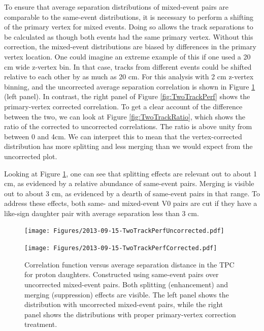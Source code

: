 To ensure that average separation distributions of mixed-event pairs are comparable to the same-event distributions, it is necessary to perform a shifting of the primary vertex for mixed events.  Doing so allows the track separations to be calculated as though both events had the same primary vertex.  Without this correction, the mixed-event distributions are biased by differences in the primary vertex location.  One could imagine an extreme example of this if one used a 20 cm wide z-vertex bin.  In that case, tracks from different events could be shifted relative to each other by as much as 20 cm.  For this analysis with 2 cm z-vertex binning, and the uncorrected average separation correlation is shown in Figure \ref{ref:TwoTrackPerf} (left panel).  In contrast, the right panel of Figure \ref{fig:TwoTrackPerf} shows the primary-vertex corrected correlation.  To get a clear account of the difference between the two, we can look at Figure \ref{fig:TwoTrackRatio}, which shows the ratio of the corrected to uncorrected correlations.  The ratio is above unity from between 0 and 4cm.  We can interpret this to mean that the vertex-corrected distribution has more splitting and less merging than we would expect from the uncorrected plot.

Looking at Figure \ref{ref:TwoTrackPerf}, one can see that splitting effects are relevant out to about 1 cm, as evidenced by a relative abundance of same-event pairs.  Merging is visible out to about 3 cm, as evidenced by a dearth of same-event pairs in that range.  To address these effects, both same- and mixed-event V0 pairs are cut if they have a like-sign daughter pair with average separation less than 3 cm.


\begin{figure}[h]
\begin{minipage}{18pc}
\texttt{[image: Figures/2013-09-15-TwoTrackPerfUncorrected.pdf]}
\end{minipage}\hspace{2pc}
\begin{minipage}{18pc}
\texttt{[image: Figures/2013-09-15-TwoTrackPerfCorrected.pdf]}
\end{minipage} 
\caption[Two-track reconstruction effects]{\label{ref:TwoTrackPerf}Correlation function versus average separation distance in the TPC for proton daughters.  Constructed using same-event pairs over uncorrected mixed-event pairs.  Both splitting (enhancement) and merging (suppression) effects are visible. The left panel shows the distribution with uncorrected mixed-event pairs, while the right panel shows the distributions with proper primary-vertex correction treatment.}
\end{figure}

